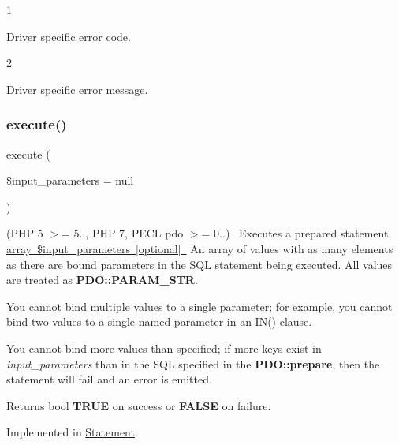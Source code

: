 1 

Driver specific error code.  

2 

Driver specific error message.  \mbox{\label{interface_pes_1_1_database_1_1_statement_1_1_p_d_o_statement_interface_a0e8db3191f62e77a6dac20beb5bd28e7}} 
\subsubsection{\texorpdfstring{execute()}{execute()}}
{\footnotesize\ttfamily execute (\begin{DoxyParamCaption}\item[{}]{\$input\+\_\+parameters = {\ttfamily null} }\end{DoxyParamCaption})}

(P\+HP 5 $>$= 5.., P\+HP 7, P\+E\+CL pdo $>$= 0..)~\newline
 Executes a prepared statement \mbox{\hyperlink{}{array \$input\+\_\+parameters \mbox{[}optional\mbox{]} }} An array of values with as many elements as there are bound parameters in the S\+QL statement being executed. All values are treated as {\bfseries P\+D\+O\+::\+P\+A\+R\+A\+M\+\_\+\+S\+TR}. 

You cannot bind multiple values to a single parameter; for example, you cannot bind two values to a single named parameter in an I\+N() clause. 

You cannot bind more values than specified; if more keys exist in {\itshape input\+\_\+parameters} than in the S\+QL specified in the {\bfseries P\+D\+O\+::prepare}, then the statement will fail and an error is emitted. 

\begin{DoxyReturn}{Returns}
bool {\bfseries T\+R\+UE} on success or {\bfseries F\+A\+L\+SE} on failure. 
\end{DoxyReturn}


Implemented in \mbox{\hyperlink{class_pes_1_1_database_1_1_statement_1_1_statement_addad8fb3f107b88d79d94550582a4355}{Statement}}.

\mbox{\label{interface_pes_1_1_database_1_1_statement_1_1_p_d_o_statement_interface_a442adc7aeb1b6d8f275aa93a700d7cac}} 

